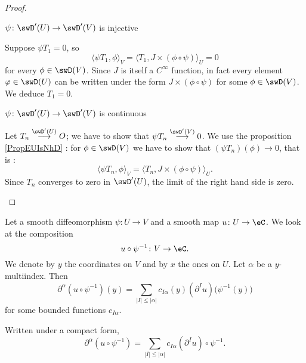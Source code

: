 \begin{proof}
\begin{subproof}
        \item[\( \psi\colon \swD'(U)\to \swD'(V)\) is injective]

            Suppose \( \psi T_1=0\), so
            \begin{equation}
                \langle \psi T_1, \phi\rangle_V =\langle T_1, J\times (\phi\circ\psi)\rangle_U=0
            \end{equation}
            for every \( \phi\in \swD(V)\). Since \( J\) is itself a \(  C^{\infty}\) function, in fact every element \( \varphi\in \swD(U)\) can be written under the form \( J\times (\phi\circ\psi)\) for some \( \phi\in\swD(V)\). We deduce \( T_1=0\).

        \item[\( \psi\colon \swD'(U)\to \swD'(V)\) is continuous]

            Let \( T_n\stackrel{\swD'(U)}{\longrightarrow}O\); we have to show that \( \psi T_n\stackrel{\swD'(V)}{\longrightarrow}0\). We use the proposition \ref{PropEUIsNhD} : for \( \phi\in\swD(V)\) we have to show that \( (\psi T_n)(\phi)\to 0\), that is :
            \begin{equation}
                \langle \psi T_n, \phi\rangle_V=\langle T_n, J\times (\phi\circ\psi)\rangle_U.
            \end{equation}
            Since \( T_n\) converges to zero in \( \swD'(U)\), the limit of the right hand side is zero.
    \end{subproof}
\end{proof}

\begin{lemma}       \label{LEMooJHFUooWdAlar}
    Let a smooth diffeomorphism \( \psi\colon U\to V\) and a smooth map \( u\colon U\to \eC\). We look at the composition
    \begin{equation}
        u\circ\psi^{-1}\colon V\to \eC.
    \end{equation}
    We denote by \( y\) the coordinates on \( V\) and by \( x\) the ones on \( U\). Let \( \alpha\) be a \( y\)-multiindex. Then
    \begin{equation}
        \partial^{\alpha}(u\circ\psi^{-1})(y)=\sum_{| I |\leq | \alpha |}c_{I \alpha}(y)(\partial^{I}u)\big( \psi^{-1}(y) \big)
    \end{equation}
    for some bounded functions \( c_{I \alpha}\).

    Written under a compact form,
    \begin{equation}
        \partial^{\alpha}(u\circ\psi^{-1})=\sum_{| I |\leq | \alpha |}c_{I \alpha}(\partial^Iu)\circ\psi^{-1}.
    \end{equation}
\end{lemma}

